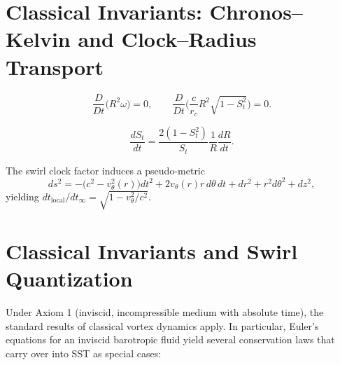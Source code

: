 \documentclass[10pt,reprint,aps,onecolumn,nofootinbib]{revtex4-2}
\begin{document}




    \section{Classical Invariants: Chronos--Kelvin and Clock--Radius Transport}\label{canon58:classical-invariants}
    \begin{tcolorbox}[title=Axiom: Chronos--Kelvin Invariant]
        \label{canon58:CK}
        \[
            \frac{D}{Dt}\big(R^2\omega\big)=0,
            \qquad
            \frac{D}{Dt}\Big(\frac{c}{r_c}R^2\sqrt{1-S_t^2}\Big)=0.
        \]
    \end{tcolorbox}
    \begin{tcolorbox}[title=Corollary: Clock--Radius Transport]
        \label{canon58:clock-transport}
        \[
            \frac{dS_t}{dt} = \frac{2(1-S_t^2)}{S_t}\frac{1}{R}\frac{dR}{dt}.
        \]
    \end{tcolorbox}
    \begin{tcolorbox}[title=Remark (Pseudo-metric)]
        The swirl clock factor induces a pseudo-metric
        \[
            ds^2 = -\big(c^2 - v_\theta^2(r)\big)dt^2 + 2v_\theta(r)r\,d\theta\,dt + dr^2 + r^2 d\theta^2 + dz^2,
        \]
        yielding $dt_{\text{local}}/dt_\infty = \sqrt{1 - v_\theta^2/c^2}$. %
    \end{tcolorbox}


    \section{Classical Invariants and Swirl Quantization}
    Under Axiom 1 (inviscid, incompressible medium with absolute time), the standard results of classical vortex dynamics apply. In particular, Euler’s equations for an inviscid barotropic fluid yield several conservation laws that carry over into SST as special cases:
\end{document}
